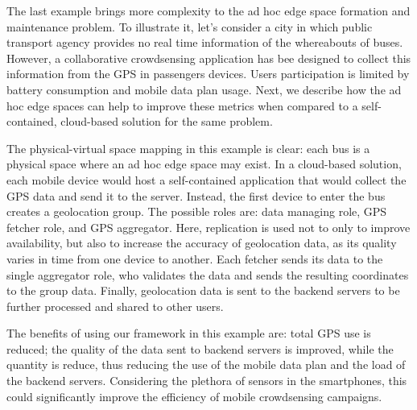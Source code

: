 The last example brings more complexity to the ad hoc edge space formation and maintenance problem. To illustrate it, let's consider a city in which public transport agency provides no real time information of the whereabouts of buses. However, a collaborative crowdsensing application has bee designed to collect this information from the GPS in passengers devices. Users participation is limited by battery consumption and mobile data plan usage. Next, we describe how the ad hoc edge spaces can help to improve these metrics when compared to a self-contained, cloud-based solution for the same problem.

The physical-virtual space mapping in this example is clear: each bus is a physical space where an ad hoc edge space may exist. In a cloud-based solution, each mobile device would host a self-contained application that would collect the GPS data and send it to the server. Instead, the first device to enter the bus creates a geolocation group. The possible roles are: data managing role, GPS fetcher role, and GPS aggregator. Here, replication is used not to only to improve availability, but also to increase the accuracy of geolocation data, as its quality varies in time from one device to another. Each fetcher sends its data to the single aggregator role, who validates the data and sends the resulting coordinates to the group data. Finally, geolocation data is sent to the backend servers to be further processed and shared to other users.

The benefits of using our framework in this example are: total GPS use is reduced; the quality of the data sent to backend servers is improved, while the quantity is reduce, thus reducing the use of the mobile data plan and the load of the backend servers. Considering the plethora of sensors in the smartphones, this could significantly improve the efficiency of mobile crowdsensing campaigns.